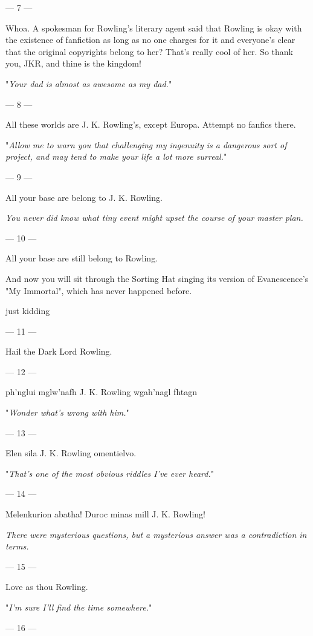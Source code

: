 {\filbreak
--- 7 ---

Whoa. A spokesman
for Rowling's literary agent said that Rowling is okay with the existence of
fanfiction as long as no one charges for it and everyone's clear that the
original copyrights belong to her? That's really cool of her. So thank you,
JKR, and thine is the kingdom!

"\emph{Your dad is almost as awesome as my dad.}"

\filbreak
--- 8 ---

All these worlds
are J. K. Rowling's, except Europa. Attempt no fanfics there.

"\emph{Allow me to warn you that challenging my ingenuity is a dangerous sort
of project, and may tend to make your life a lot more surreal.}"

\filbreak
--- 9 ---

All your base are
belong to J. K. Rowling.

\emph{You never did know what tiny event might upset the course of your master
plan.}

\filbreak
--- 10 ---

All your base are
still belong to Rowling.

And now you will sit through the Sorting Hat singing its version of
Evanescence's "My Immortal", which has never happened before.

just kidding

\filbreak
--- 11 ---

Hail the Dark Lord Rowling.

\filbreak
--- 12 ---

ph'nglui mglw'nafh J. K. Rowling wgah'nagl fhtagn

"\emph{Wonder what's wrong with \emph{him}.}"

\filbreak
--- 13 ---

Elen sila J. K. Rowling omentielvo.

"\emph{That's one of the most obvious riddles I've ever heard.}"

\filbreak
--- 14 ---

Melenkurion abatha! Duroc minas mill J. K. Rowling!

\emph{There were mysterious questions, but a mysterious answer was a
contradiction in terms.}

\filbreak
--- 15 ---

Love as thou Rowling.

"\emph{I'm sure I'll find the time somewhere.}"

\filbreak
--- 16 ---

}
